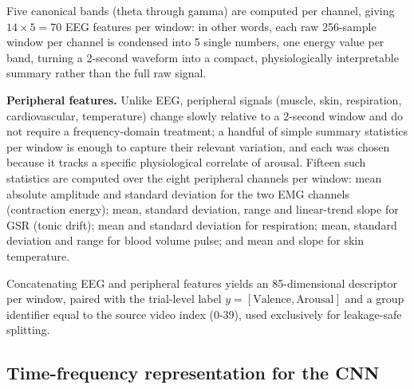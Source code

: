 \documentclass[conference]{IEEEtran}
\begin{document}
Five canonical bands (theta through gamma) are computed per channel,
giving $14 \times 5 = 70$ EEG features per window: in other words, each
raw 256-sample window per channel is condensed into 5 single numbers, one
energy value per band, turning a 2-second waveform into a compact,
physiologically interpretable summary rather than the full raw signal.

\textbf{Peripheral features.} Unlike EEG, peripheral signals (muscle,
skin, respiration, cardiovascular, temperature) change slowly relative to
a 2-second window and do not require a frequency-domain treatment; a
handful of simple summary statistics per window is enough to capture
their relevant variation, and each was chosen because it tracks a
specific physiological correlate of arousal. Fifteen such statistics are
computed over the eight peripheral channels per window: mean absolute
amplitude and
standard deviation for the two EMG channels (contraction energy); mean,
standard deviation, range and linear-trend slope for GSR (tonic drift);
mean and standard deviation for respiration; mean, standard deviation and
range for blood volume pulse; and mean and slope for skin temperature.

Concatenating EEG and peripheral features yields an 85-dimensional
descriptor per window, paired with the trial-level label
$y = [\text{Valence}, \text{Arousal}]$ and a group identifier equal to the
source video index (0-39), used exclusively for leakage-safe splitting.

\subsection{Time-frequency representation for the CNN}
\label{subsec:spectrograms}
\end{document}
